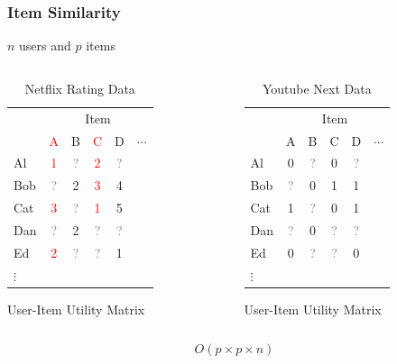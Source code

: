 \documentclass[xcolor={dvipsnames}]{beamer}
\begin{document}
\frame
{
\frametitle{Item Similarity}

$n$ users and $p$ items 

\begin{columns}
\begin{column}{.5\textwidth}

\begin{table}
\begin{tabular}{|l|ccccc|}
\hline
  & \multicolumn{5}{|c|}{Item} \\
    & \textcolor{red}{A} & B & \textcolor{red}{C} & D & $\cdots$ \\ \hline
Al & \textcolor{red}{1} & \textcolor{gray}{?} & \textcolor{red}{2} & \textcolor{gray}{?} &\\
Bob & \textcolor{gray}{?} & 2 & \textcolor{red}{3} & 4 &\\
Cat & \textcolor{red}{3} & \textcolor{gray}{?} & \textcolor{red}{1} & 5&\\
Dan & \textcolor{gray}{?} & 2 & \textcolor{gray}{?} & \textcolor{gray}{?}& \\
Ed & \textcolor{red}{2} &   \textcolor{gray}{?} & \textcolor{gray}{?} & 1&\\
$\vdots$ &&&&&\\ \hline
\end{tabular}
\caption{Netflix Rating Data}
User-Item Utility Matrix
\end{table}


\end{column}
\begin{column}{.5\textwidth}

\begin{table}
\begin{tabular}{|l|ccccc|}
\hline
  & \multicolumn{5}{|c|}{Item} \\
    & A & B & C & D & $\cdots$ \\ \hline
Al & 0 & \textcolor{gray}{?} & 0 & \textcolor{gray}{?} &\\
Bob & \textcolor{gray}{?} & 0 & 1 & 1 &\\
Cat & 1 & \textcolor{gray}{?} & 0 & 1&\\
Dan & \textcolor{gray}{?} & 0 & \textcolor{gray}{?} & \textcolor{gray}{?}& \\
Ed & 0 &   \textcolor{gray}{?} & \textcolor{gray}{?} & 0 &\\
$\vdots$ &&&&&\\ \hline
\end{tabular}
\caption{Youtube Next Data}
User-Item Utility Matrix
\end{table}


\end{column}
\end{columns}

\Huge
$$O(p\times  p \times n)$$

}
\end{document}
